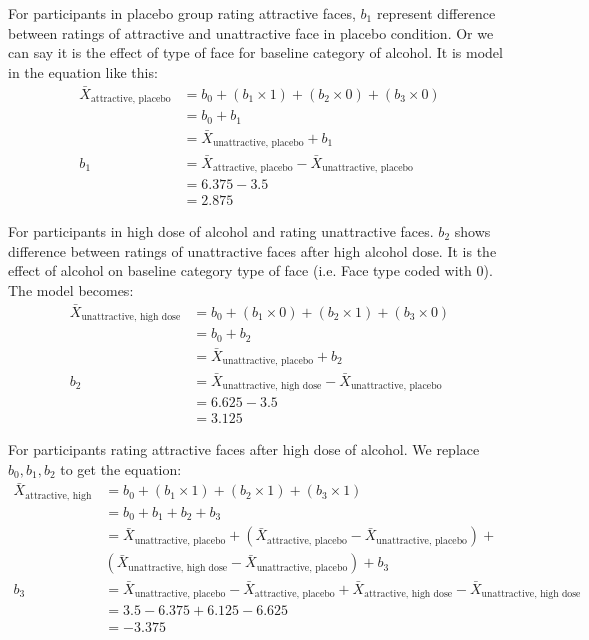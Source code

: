 \documentclass[a4paper, 12pt]{book}
\begin{document}
For participants in placebo group rating attractive faces, $b_1$ represent difference between ratings of attractive and unattractive face in placebo condition. Or we can say it is the effect of type of face for baseline category of alcohol. It is model in the equation like this:
\begin{equation}
\begin{split}
\bar{X}_{\text{attractive, placebo}} & = b_0 + (b_1 \times 1) + (b_2 \times 0) + (b_3 \times 0) \\
& = b_0 + b_1 \\
& = \bar{X}_{\text{unattractive, placebo}} + b_1 \\
b_1 & = \bar{X}_{\text{attractive, placebo}} - \bar{X}_{\text{unattractive, placebo}} \\
& = 6.375 - 3.5\\
& = 2.875
\end{split}
\end{equation}
\clearpage

For participants in high dose of alcohol and rating unattractive faces. $b_2$ shows difference between ratings of unattractive faces after high alcohol dose. It is the effect of alcohol on baseline category type of face (i.e. Face type coded with 0). The model becomes:
\begin{equation}
\begin{split}
\bar{X}_{\text{unattractive, high dose}} & = b_0 + (b_1 \times 0) + (b_2 \times 1) + (b_3 \times 0) \\
& = b_0 + b_2 \\
& = \bar{X}_{\text{unattractive, placebo}} + b_2 \\
b_2 & = \bar{X}_{\text{unattractive, high dose}} - \bar{X}_{\text{unattractive, placebo}} \\
& = 6.625 - 3.5\\
& = 3.125
\end{split}
\end{equation}


For participants rating attractive faces after high dose of alcohol. We replace $b_0, b_1, b_2$ to get the equation:
\begin{equation}
\begin{split}
\bar{X}_{\text{attractive, high dose}} & = b_0 + (b_1 \times 1) + (b_2 \times 1) + (b_3 \times 1) \\
& = b_0 + b_1 + b_2 + b_3 \\
& = \bar{X}_{\text{unattractive, placebo}} + (\bar{X}_{\text{attractive, placebo}} - \bar{X}_{\text{unattractive, placebo}}) +  \\
 & (\bar{X}_{\text{unattractive, high dose}} - \bar{X}_{\text{unattractive, placebo}}) + b_3\\
b_3 & = \bar{X}_{\text{unattractive, placebo}} - \bar{X}_{\text{attractive, placebo}}  + \bar{X}_{\text{attractive, high dose}} - \bar{X}_{\text{unattractive, high dose}} \\
& = 3.5 - 6.375 + 6.125 - 6.625\\
& = -3.375
\end{split}
\end{equation}
\end{document}
